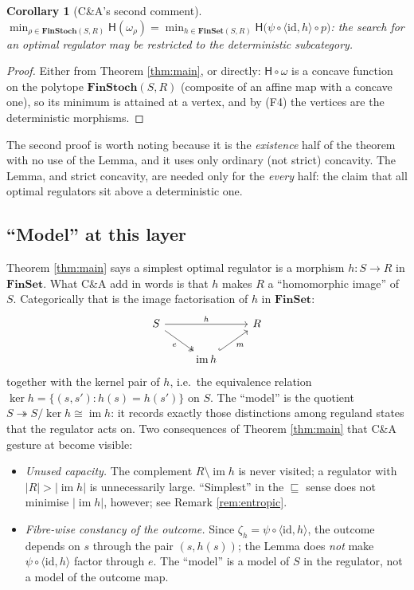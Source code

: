 \documentclass[11pt,a4paper]{article}
\newtheorem{corollary}[theorem]{Corollary}
\theoremstyle{definition}
\theoremstyle{remark}
\newcommand{\FinSet}{\mathbf{FinSet}}
\newcommand{\FinStoch}{\mathbf{FinStoch}}
\newcommand{\id}{\mathrm{id}}
\newcommand{\im}{\operatorname{im}}
\newcommand{\ent}{\mathsf{H}}
\newcommand{\refines}{\sqsubseteq}
\newcommand{\pair}[2]{\langle #1,#2\rangle}
\begin{document}
\begin{corollary}[C\&A's second comment]
$\min_{\rho\in\FinStoch(S,R)}\ent(\omega_\rho)=\min_{h\in\FinSet(S,R)}\ent\big(\psi\circ\pair{\id}{h}\circ p\big)$: the search for an optimal regulator may be restricted to the deterministic subcategory.
\end{corollary}
\begin{proof}
Either from Theorem \ref{thm:main}, or directly: $\ent\circ\omega$ is a concave function on the polytope $\FinStoch(S,R)$ (composite of an affine map with a concave one), so its minimum is attained at a vertex, and by (F4) the vertices are the deterministic morphisms.
\end{proof}

The second proof is worth noting because it is the \emph{existence} half of the
theorem with no use of the Lemma, and it uses only ordinary (not strict)
concavity. The Lemma, and strict concavity, are needed only for the
\emph{every} half: the claim that all optimal regulators sit above a
deterministic one.

\subsection{``Model'' at this layer}

Theorem \ref{thm:main} says a simplest optimal regulator is a morphism
$h\colon S\to R$ in $\FinSet$. What C\&A add in words is that $h$ makes $R$ a
``homomorphic image'' of $S$. Categorically that is the image factorisation of
$h$ in $\FinSet$:
\[
\begin{tikzcd}
S \arrow[rr,"h"] \arrow[dr,two heads,"e"'] && R \\ & \im h \arrow[ur,hook,"m"']
\end{tikzcd}
\]
together with the kernel pair of $h$, i.e.\ the equivalence relation
$\ker h=\{(s,s'):h(s)=h(s')\}$ on $S$. The ``model'' is the quotient
$S\twoheadrightarrow S/\!\ker h\cong\im h$: it records exactly those
distinctions among reguland states that the regulator acts on. Two consequences
of Theorem \ref{thm:main} that C\&A gesture at become visible:
\begin{itemize}
\item \emph{Unused capacity.} The complement $R\setminus\im h$ is never visited; a regulator with $|R|>|\im h|$ is unnecessarily large. ``Simplest'' in the $\refines$ sense does not minimise $|\im h|$, however; see Remark \ref{rem:entropic}.
\item \emph{Fibre-wise constancy of the outcome.} Since $\zeta_h=\psi\circ\pair{\id}{h}$, the outcome depends on $s$ through the pair $(s,h(s))$; the Lemma does \emph{not} make $\psi\circ\pair{\id}{h}$ factor through $e$. The ``model'' is a model of $S$ in the regulator, not a model of the outcome map.
\end{itemize}
\end{document}
